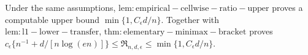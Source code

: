 Under the same assumptions, \(\mathrm{lem:empirical-cellwise-ratio-upper}\) proves a computable upper bound \(\min\{1,C_\epsilon d/n\}\).  Together with \(\mathrm{lem:l1-lower-transfer}\), \(\mathrm{thm:elementary-minimax-bracket}\) proves \(c_\epsilon\{n^{-1}+d/[n\log(en)]\}\leq\mathfrak R_{n,d,\epsilon}\leq\min\{1,C_\epsilon d/n\}\).